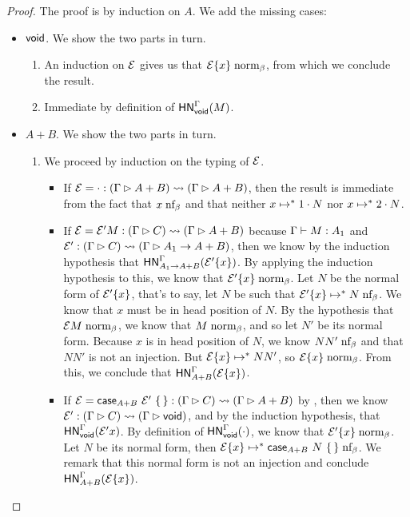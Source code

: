 \documentclass{article}
\begin{document}
\begin{proof}
  The proof is by induction on $A$.
  We add the missing cases:
  \begin{itemize}
  \item $\void$. We show the two parts in turn.
    \begin{enumerate}
    \item An induction on $\E$ gives us that $\mathcal{E}\{x\} \mathrel{\text{norm}_\beta}$, from which we conclude the result.
    \item Immediate by definition of $\mathsf{HN}^{\Gamma}_{\mathsf{void}}(M)$.
    \end{enumerate}
  \item $A + B$. We show the two parts in turn.
    \begin{enumerate}
    \item We proceed by induction on the typing of $\E$.
      \begin{itemize}
      \item If $\mathcal{E} = \cdot : (\Gamma \rhd A + B) \leadsto (\Gamma \rhd A + B)$, then the result is immediate from the fact that $x \mathrel{\text{nf}_\beta}$ and that neither $x \mapsto^* 1\cdot N$ nor $x \mapsto^* 2\cdot N$.
      \item If $\mathcal{E} = \mathcal{E}' M : (\Gamma \rhd C) \leadsto (\Gamma \rhd A+B)$ because $\Gamma \vdash M : A_1$ and $\mathcal{E}' : (\Gamma \rhd C) \leadsto (\Gamma \rhd A_1 \to A+B)$, then we know by the induction hypothesis that $\mathsf{HN}^{\Gamma}_{A_1 \to A + B}(\mathcal{E}'\{x\})$.
        By applying the induction hypothesis to this, we know that $\mathcal{E}'\{x\} \mathrel{\text{norm}_\beta}$.
        Let $N$ be the normal form of $\mathcal{E}'\{x\}$, that's to say, let $N$ be such that $\mathcal{E}'\{x\} \mapsto^* N \mathrel{\text{nf}_\beta}$.
        We know that $x$ must be in head position of $N$.
        By the hypothesis that $\mathcal{E} M \mathrel{\text{norm}_\beta}$, we know that $M \mathrel{\text{norm}_\beta}$, and so let $N'$ be its normal form.
        Because $x$ is in head position of $N$, we know $NN' \mathrel{\text{nf}_\beta}$ and that $NN'$ is not an injection.
        But $\mathcal{E}\{x\} \mapsto^* NN'$, so $\mathcal{E}\{x\} \mathrel{\text{norm}_\beta}$.
        From this, we conclude that $\mathsf{HN}^{\Gamma}_{A+B}(\mathcal{E}\{x\})$.
      \item If $\mathcal{E} = \mathsf{case}_{A+B}\ \mathcal{E}'\ \{\,\} : (\Gamma \rhd C) \leadsto (\Gamma \rhd A+B)$ by \rn{$\E$-$\void$}, then we know $\mathcal{E}' : (\Gamma \rhd C) \leadsto (\Gamma \rhd \mathsf{void})$, and by the induction hypothesis, that $\mathsf{HN}^{\Gamma}_{\mathsf{void}}(\mathcal{E}'{x})$.
        By definition of $\mathsf{HN}^{\Gamma}_{\mathsf{void}}(\cdot)$, we know that $\mathcal{E}'\{x\} \mathrel{\text{norm}_\beta}$.
        Let $N$ be its normal form, then $\mathcal{E}\{x\} \mapsto^* \mathsf{case}_{A+B}\ N\ \{\,\} \mathrel{\text{nf}_\beta}$.
        We remark that this normal form is not an injection and conclude $\mathsf{HN}^{\Gamma}_{A+B}(\mathcal{E}\{x\})$.

\end{itemize}
\end{enumerate}
\end{itemize}
\end{proof}
\end{document}
